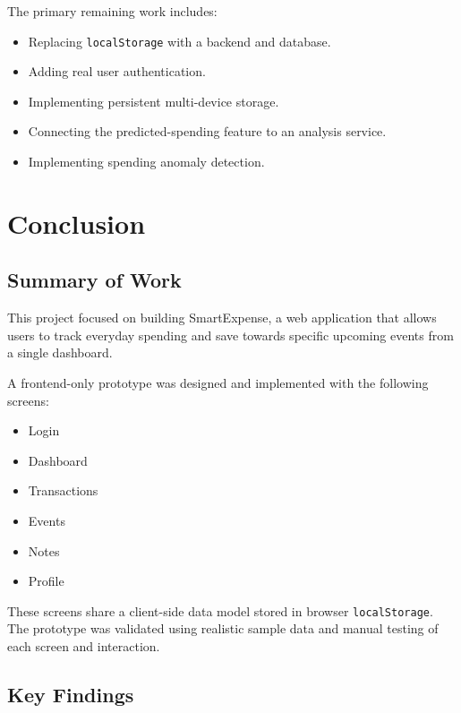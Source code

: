 \documentclass[12pt,a4paper]{report}
\begin{document}
The primary remaining work includes:

\begin{itemize}
    \item Replacing \texttt{localStorage} with a backend and database.
    \item Adding real user authentication.
    \item Implementing persistent multi-device storage.
    \item Connecting the predicted-spending feature to an analysis service.
    \item Implementing spending anomaly detection.
\end{itemize}



\chapter{Conclusion}

\section{Summary of Work}

This project focused on building SmartExpense, a web application that allows
users to track everyday spending and save towards specific upcoming events
from a single dashboard.

A frontend-only prototype was designed and implemented with the following
screens:

\begin{itemize}
    \item Login
    \item Dashboard
    \item Transactions
    \item Events
    \item Notes
    \item Profile
\end{itemize}

These screens share a client-side data model stored in browser
\texttt{localStorage}. The prototype was validated using realistic sample
data and manual testing of each screen and interaction.

\section{Key Findings}
\end{document}
